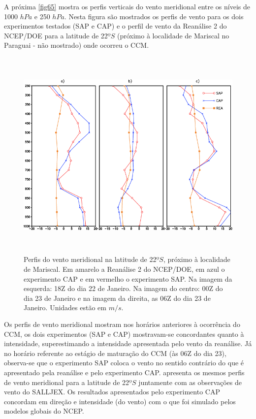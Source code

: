 \break

A próxima \autoref{fig65} mostra os perfis verticais do vento meridional entre os níveis de 1000 $hPa$ e 250 $hPa$. Nesta figura são mostrados os perfis de vento para os dois experimentos testados (SAP e CAP) e o perfil de vento da Reanálise 2 do NCEP/DOE para a latitude de 22$ºS$ (próximo à localidade de Mariscal no Paraguai - não mostrado) onde ocorreu o CCM. 

\begin{figure}[!hpb]
\centering
\includegraphics[height=10.5cm]{./figs/perf_vert_vento.png}
\caption{Perfis do vento meridional na latitude de 22$ºS$, próximo à localidade de Mariscal. Em amarelo a Reanálise 2 do NCEP/DOE, em azul o experimento CAP e em vermelho o experimento SAP. Na imagem da esquerda: 18Z do dia 22 de Janeiro. Na imagem do centro: 00Z do dia 23 de Janeiro e na imagem da direita, as 06Z do dia 23 de Janeiro. Unidades estão em $m/s$.}
\label{fig65}
\end{figure}

Os perfis de vento meridional mostram nos horários anteriores à ocorrência do CCM, os dois experimentos (SAP e CAP) mostravam-se concordantes quanto à intensidade, superestimando a intensidade apresentada pelo vento da reanálise. Já no horário referente ao estágio de maturação do CCM (às 06Z do dia 23), observa-se que o experimento SAP coloca o vento no sentido contrário do que é apresentado pela reanálise e pelo experimento CAP.  apresenta os mesmos perfis de vento meridional para a latitude de 22$ºS$ juntamente com as observações de vento do SALLJEX. Os resultados apresentados pelo experimento CAP concordam em direção e intensidade (do vento) com o que foi simulado pelos modelos globais do NCEP.

